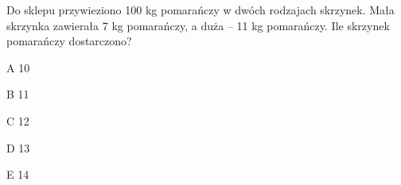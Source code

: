 \begin{tresc}
Do sklepu przywieziono 100 kg pomarańczy w dwóch rodzajach skrzynek. Mała skrzynka zawierała 7 kg pomarańczy, a duża – 11 kg pomarańczy. Ile skrzynek pomarańczy dostarczono?
\end{tresc}
\begin{wariant}{A} 10 \end{wariant}
\begin{wariant}{B} 11 \end{wariant}
\begin{wariant}{C} 12 \end{wariant}
\begin{wariant}{D} 13 \end{wariant}
\begin{wariant}{E} 14 \end{wariant}
